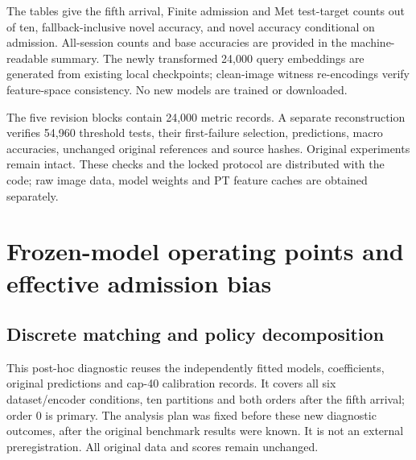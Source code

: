 \documentclass[preprint,review,12pt]{elsarticle}
\begin{document}
The tables give the fifth arrival, Finite admission and Met test-target counts out of ten, fallback-inclusive novel accuracy, and novel accuracy conditional on admission. All-session counts and base accuracies are provided in the machine-readable summary. The newly transformed 24,000 query embeddings are generated from existing local checkpoints; clean-image witness re-encodings verify feature-space consistency. No new models are trained or downloaded.
\begin{table}[htbp]
\centering\setlength{\belowcaptionskip}{8pt}
\caption{L14, protection certificate under clean or matched-shift calibration. Novel columns are percentages.}
\resizebox{\linewidth}{!}{}
\end{table}
\begin{table}[htbp]
\centering\setlength{\belowcaptionskip}{8pt}
\caption{L14, paired accuracy certificate under clean or matched-shift calibration. Novel columns are percentages.}
\resizebox{\linewidth}{!}{}
\end{table}
\begin{table}[htbp]
\centering\setlength{\belowcaptionskip}{8pt}
\caption{B32, protection certificate under clean or matched-shift calibration. Novel columns are percentages.}
\resizebox{\linewidth}{!}{}
\end{table}
\begin{table}[htbp]
\centering\setlength{\belowcaptionskip}{8pt}
\caption{B32, paired accuracy certificate under clean or matched-shift calibration. Novel columns are percentages.}
\resizebox{\linewidth}{!}{}
\end{table}

\FloatBarrier
The five revision blocks contain 24,000 metric records. A separate reconstruction verifies 54,960 threshold tests, their first-failure selection, predictions, macro accuracies, unchanged original references and source hashes. Original experiments remain intact. These checks and the locked protocol are distributed with the code; raw image data, model weights and PT feature caches are obtained separately.


\FloatBarrier
\section{Frozen-model operating points and effective admission bias}
\label{app:mechanismfollowup}
\subsection{Discrete matching and policy decomposition}
This post-hoc diagnostic reuses the independently fitted models, coefficients, original predictions and cap-40 calibration records. It covers all six dataset/encoder conditions, ten partitions and both orders after the fifth arrival; order 0 is primary. The analysis plan was fixed before these new diagnostic outcomes, after the original benchmark results were known. It is not an external preregistration. All original data and scores remain unchanged.
\end{document}
